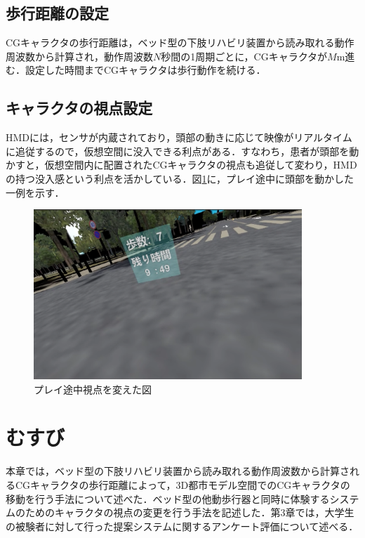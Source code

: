 \subsection{歩行距離の設定}
CGキャラクタの歩行距離は，ベッド型の下肢リハビリ装置から読み取れる動作周波数から計算され，動作周波数$N$秒間の1周期ごとに，CGキャラクタが$M$m進む．設定した時間までCGキャラクタは歩行動作を続ける．

\subsection{キャラクタの視点設定}
HMDには，センサが内蔵されており，頭部の動きに応じて映像がリアルタイムに追従するので，仮想空間に没入できる利点がある．すなわち，患者が頭部を動かすと，仮想空間内に配置されたCGキャラクタの視点も追従して変わり，HMDの持つ没入感という利点を活かしている．図\ref{fig:geammidstream}に，プレイ途中に頭部を動かした一例を示す．

\begin{figure}[tbp]
	\centering
			\includegraphics[width=0.9\textwidth]{chap2-figure/midstream-2.eps}
	\caption{プレイ途中視点を変えた図}
	\label{fig:geammidstream}
\end{figure}
\fi

\section{むすび}

本章では，ベッド型の下肢リハビリ装置から読み取れる動作周波数から計算されるCGキャラクタの歩行距離によって，3D都市モデル空間でのCGキャラクタの移動を行う手法について述べた．ベッド型の他動歩行器と同時に体験するシステムのためのキャラクタの視点の変更を行う手法を記述した．第3章では，大学生の被験者に対して行った提案システムに関するアンケート評価について述べる．
\fi


